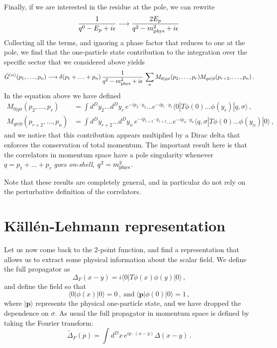 Finally, if we are interested in the residue at the pole, we can rewrite
\begin{align}
  \frac{1}{q^0-E_p + i\epsilon} \longrightarrow \frac{2 E_p}{q^2-m_\mathrm{phys}^2 + i\epsilon}\, 
\end{align}
Collecting all the terms, and ignoring a phase factor that reduces to
one at the pole, we find that the one-particle state contribution to the
integration over the specific sector that we considered above yields
\begin{align}
  \tilde{G}^{(n)}(p_1,\ldots,p_n) \longrightarrow
  \delta(p_1+\ldots+p_n)\, \frac{1}{q^2-m_\mathrm{phys}^2+i\epsilon}\, 
  \sum_\sigma M_{0|q\sigma}(p_2,\ldots,p_r) M_{q\sigma|0}(p_{r+2},
  \ldots, p_n)\, .
\end{align}
In the equation above we have defined
\begin{align}
  M_{0|q\sigma}(p_2,\ldots,p_r) 
  &= \int d^Dy_2 \ldots d^Dy_r\, 
    e^{-ip_2\cdot y_2} \ldots e^{-ip_r\cdot y_r}
    \langle 0 |  T \phi(0) \ldots \phi(y_r) |
    q,\sigma\rangle \, , \\
 M_{q\sigma|0}(p_{r+2},\ldots, p_n) 
  &= \int d^Dy_{r+2} \ldots d^Dy_n\, 
    e^{-ip_{r+2}\cdot y_{r+2}} \ldots e^{-ip_n\cdot y_n}
    \langle q,\sigma |  T \phi(0) \ldots \phi(y_n) |
    0\rangle \, ,
\end{align}
and we notice that this contribution appears multiplied by a Dirac
delta that enforces the conservation of total momentum. The important
result here is that the correlators in momentum space have a pole
singularity whenever $q=p_1+\ldots+p_r$ {\em goes on-shell}, \ie
$q^2=m_\mathrm{phys}^2$.

Note that these results are completely general, and in particular do
not rely on the perturbative definition of the correlators. 

\section{Källén-Lehmann representation}
\label{sec:kall-lehm-repr}

Let us now come back to the 2-point function, and find a representation
that allows us to extract some physical information about the scalar
field. We define the full propagator as
\begin{equation}
  \label{eq:FullProp}
  \Delta_F(x-y) = i \langle 0| T \phi(x) \phi(y) |0\rangle \, ,
\end{equation}
and define the field so that
\begin{equation}
  \label{eq:FieldNorm}
  \langle 0 | \phi(x) | 0\rangle = 0\, ,\ \mathrm{and}\
  \langle \mathbf{p}| \phi(0) | 0\rangle = 1\, ,
\end{equation}
where $|\mathbf{p}\rangle$ represents the physical one-particle state,
and we have dropped the dependence on $\sigma$. As usual the full
propagator in momentum space is defined by taking the Fourier
transform:
\begin{equation}
  \label{eq:FullPropMom}
  \tilde{\Delta}_F(p) = 
  \int d^Dx\,  e^{ip\cdot(x-y)} \Delta(x-y)\, .
\end{equation}

